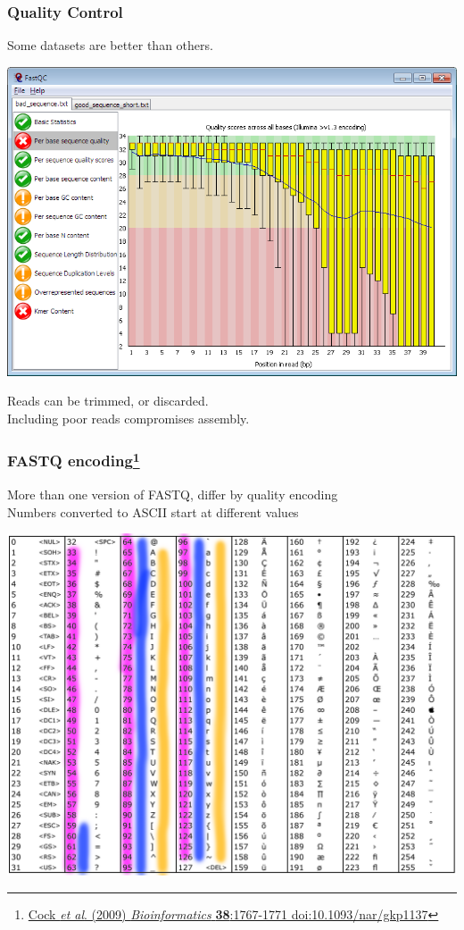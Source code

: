 \begin{frame}[fragile]
  \frametitle{Quality Control}
  Some datasets are better than others.\\
  \begin{center}
    \includegraphics[height=0.5\textheight]{images/fastqc}
  \end{center}  
  Reads can be trimmed, or discarded.\\
  Including poor reads compromises assembly.
\end{frame}

\begin{frame}[fragile]
  \frametitle{FASTQ encoding\footnote{\tiny{\href{http://dx.doi.org/10.1093/nar/gkp1137}{Cock \textit{et al}. (2009) \textit{Bioinformatics} \textbf{38}:1767-1771 doi:10.1093/nar/gkp1137}}}}
  More than one version of FASTQ, differ by quality encoding \\
  Numbers converted to ASCII start at different values
    \begin{center}
      \includegraphics[height=0.7\textheight]{images/ascii_table}
    \end{center}  
\end{frame}

